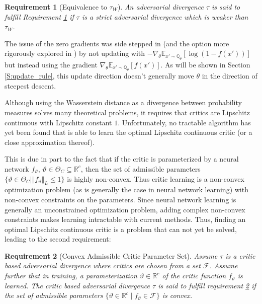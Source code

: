 \documentclass{article}
\newtheorem{requirement}{Requirement}
\begin{document}
 \begin{requirement}[Equivalence to $\tau_W$]\label{R:nonzero}
 An adversarial divergence $\tau$ is said to fulfill Requirement \ref{R:nonzero} if $\tau$ is a strict adversarial divergence
 which is weaker than $\tau_W$.
 \end{requirement}

 The issue of the zero gradients was side stepped in \cite{goodfellow2014generative}
 (and the option more rigorously explored in \cite{fedus2017many})
 by not updating with $-\nabla_{\theta}\mathbb E_{x'\sim\mathbb Q_\theta}[\log(1-f(x'))]$ but instead using the gradient
 $\nabla_{\theta}\mathbb E_{x'\sim\mathbb Q_\theta}[f(x')]$.
 As will be shown in Section \ref{S:update_rule}, this update direction doesn't generally move $\theta$ in the direction of steepest descent.

 Although using the Wasserstein distance as a divergence between probability measures solves many theoretical problems,
 it requires that critics are Lipschitz continuous with Lipschitz constant $1$.
 Unfortunately, no tractable algorithm has yet been found that is able to learn the optimal Lipschitz continuous critic
 (or a close approximation thereof).

 This is due in part to the fact that if the critic is
 parameterized by a neural network $f_\vartheta$, $\vartheta\in\Theta_C\subseteq\mathbb R^c$, then the set of admissible parameters
 $\{\vartheta\in\Theta_C\mid\Vert f_\vartheta\Vert_L\leq 1\}$ is highly non-convex.
 Thus critic learning is a non-convex optimization problem (as is generally the case in neural network learning)
 with non-convex constraints on the parameters.
 Since neural network learning is generally an unconstrained optimization problem, adding complex non-convex constraints makes learning intractable with current methods.
 Thus, finding an optimal Lipschitz continuous critic is a problem that can not yet be solved,
 leading to the second requirement:

 \begin{requirement}[Convex Admissible Critic Parameter Set]\label{R:convex_admissible}
 Assume $\tau$ is a critic based adversarial divergence where critics are chosen from a set $\mathcal F$.
 Assume further that in training, a parameterization
 $\vartheta\in\mathbb R^c$ of the critic function $f_\vartheta$ is learned.
 The critic based adversarial divergence $\tau$ is said to fulfill requirement \ref{R:convex_admissible} if
 the set of admissible parameters $\{\vartheta\in\mathbb R^c\mid f_\vartheta\in\mathcal F\}$ is convex.
 \end{requirement}
\end{document}
